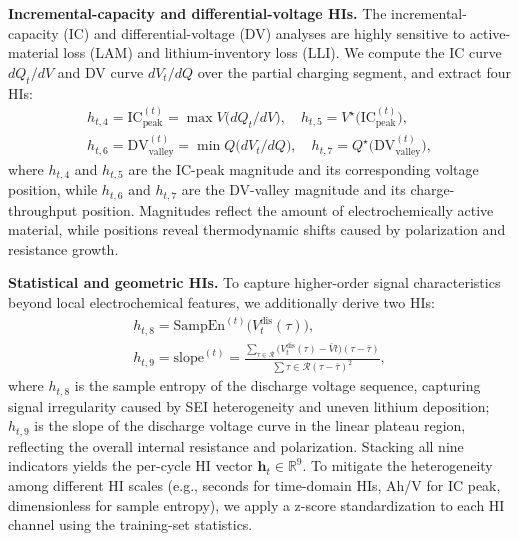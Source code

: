 \documentclass[preprint,12pt]{elsarticle}
\begin{document}
\textbf{Incremental-capacity and differential-voltage HIs.} The incremental-capacity (IC) and differential-voltage (DV) analyses are highly sensitive to active-material loss (LAM) and lithium-inventory loss (LLI). We compute the IC curve $dQ_t/dV$ and DV curve $dV_t/dQ$ over the partial charging segment, and extract four HIs:
\begin{gather}
h_{t,4} = \text{IC}_{\text{peak}}^{(t)} = \max{V}\bigl(dQ_t/dV\bigr),\quad h_{t,5} = V^{\star}\bigl(\text{IC}_{\text{peak}}^{(t)}\bigr), \\
h_{t,6} = \text{DV}_{\text{valley}}^{(t)} = \min{Q}\bigl(dV_t/dQ\bigr),\quad h_{t,7} = Q^{\star}\bigl(\text{DV}_{\text{valley}}^{(t)}\bigr),
\end{gather}
where $h_{t,4}$ and $h_{t,5}$ are the IC-peak magnitude and its corresponding voltage position, while $h_{t,6}$ and $h_{t,7}$ are the DV-valley magnitude and its charge-throughput position. Magnitudes reflect the amount of electrochemically active material, while positions reveal thermodynamic shifts caused by polarization and resistance growth.

\textbf{Statistical and geometric HIs.} To capture higher-order signal characteristics beyond local electrochemical features, we additionally derive two HIs:
\begin{gather}
h_{t,8} = \text{SampEn}^{(t)}\bigl(V_t^{\text{dis}}(\tau)\bigr), \\
h_{t,9} = \text{slope}^{(t)} = \frac{\sum_{\tau \in \mathcal{R}}\bigl(V_t^{\text{dis}}(\tau) - \bar{V}t\bigr)(\tau - \bar{\tau})}{\sum{\tau \in \mathcal{R}}(\tau - \bar{\tau})^2}, 
\end{gather}
where $h_{t,8}$ is the sample entropy of the discharge voltage sequence, capturing signal irregularity caused by SEI heterogeneity and uneven lithium deposition; $h_{t,9}$ is the slope of the discharge voltage curve in the linear plateau region, reflecting the overall internal resistance and polarization. Stacking all nine indicators yields the per-cycle HI vector $\mathbf{h}_t \in \mathbb{R}^{9}$. To mitigate the heterogeneity among different HI scales (e.g., seconds for time-domain HIs, Ah/V for IC peak, dimensionless for sample entropy), we apply a z-score standardization to each HI channel using the training-set statistics.
\end{document}
